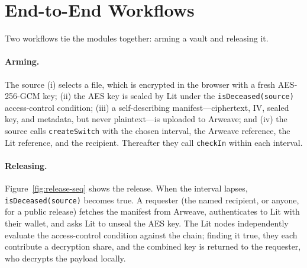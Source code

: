 \section{End-to-End Workflows}
\label{sec:design-workflows}

Two workflows tie the modules together: arming a vault and releasing it.

\paragraph{Arming.} The source (i) selects a file, which is encrypted in the
browser with a fresh AES-256-GCM key; (ii) the AES key is sealed by Lit under the
\texttt{isDeceased(source)} access-control condition; (iii) a self-describing
manifest---ciphertext, IV, sealed key, and metadata, but never plaintext---is
uploaded to Arweave; and (iv) the source calls \texttt{createSwitch} with the
chosen interval, the Arweave reference, the Lit reference, and the recipient.
Thereafter they call \texttt{checkIn} within each interval.

\paragraph{Releasing.} Figure~\ref{fig:release-seq} shows the release. When the
interval lapses, \texttt{isDeceased(source)} becomes true. A requester (the named
recipient, or anyone, for a public release) fetches the manifest from Arweave,
authenticates to Lit with their wallet, and asks Lit to unseal the AES key. The
Lit nodes independently evaluate the access-control condition against the chain;
finding it true, they each contribute a decryption share, and the combined key is
returned to the requester, who decrypts the payload locally.

